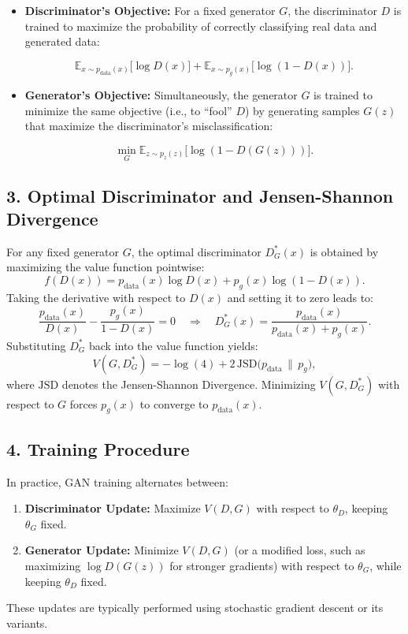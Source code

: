 \documentclass{article}
\begin{document}
\begin{itemize}
    \item \textbf{Discriminator’s Objective:} For a fixed generator $G$, the discriminator $D$ is trained to maximize the probability of correctly classifying real data and generated data:

    \[
    \mathbb{E}_{x\sim p_{\text{data}}(x)}\big[\log D(x)\big] + \mathbb{E}_{x\sim p_g(x)}\big[\log (1 - D(x))\big].
    \]

    \item \textbf{Generator’s Objective:} Simultaneously, the generator $G$ is trained to minimize the same objective (i.e., to “fool” $D$) by generating samples $G(z)$ that maximize the discriminator's misclassification:

    \[
    \min_{G} \mathbb{E}_{z\sim p_z(z)}\big[\log (1 - D(G(z)))\big].
    \]
\end{itemize}

\subsection*{3. Optimal Discriminator and Jensen-Shannon Divergence}

For any fixed generator $G$, the optimal discriminator $D^*_G(x)$ is obtained by maximizing the value function pointwise:
\[
f(D(x)) = p_{\text{data}}(x) \log D(x) + p_g(x) \log (1 - D(x)).
\]
Taking the derivative with respect to $D(x)$ and setting it to zero leads to:
\[
\frac{p_{\text{data}}(x)}{D(x)} - \frac{p_g(x)}{1-D(x)} = 0 \quad \Longrightarrow \quad D^*_G(x) = \frac{p_{\text{data}}(x)}{p_{\text{data}}(x) + p_g(x)}.
\]
Substituting $D^*_G$ back into the value function yields:
\[
V(G, D^*_G) = -\log(4) + 2\, \mathrm{JSD}\big(p_{\text{data}} \,\|\, p_g\big),
\]
where $\mathrm{JSD}$ denotes the Jensen-Shannon Divergence. Minimizing $V(G, D^*_G)$ with respect to $G$ forces $p_g(x)$ to converge to $p_{\text{data}}(x)$.

\subsection*{4. Training Procedure}

In practice, GAN training alternates between:
\begin{enumerate}
    \item \textbf{Discriminator Update:} Maximize $V(D, G)$ with respect to $\theta_D$, keeping $\theta_G$ fixed.
    \item \textbf{Generator Update:} Minimize $V(D, G)$ (or a modified loss, such as maximizing $\log D(G(z))$ for stronger gradients) with respect to $\theta_G$, while keeping $\theta_D$ fixed.
\end{enumerate}
These updates are typically performed using stochastic gradient descent or its variants.
\end{document}
